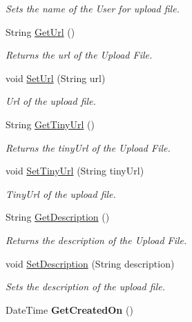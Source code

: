 \begin{DoxyCompactItemize}
\begin{DoxyCompactList}\small\item\em Sets the name of the User for upload file. \end{DoxyCompactList}\item 
String \hyperlink{classcom_1_1shephertz_1_1app42_1_1paas_1_1sdk_1_1csharp_1_1avatar_1_1_avatar_aa861c814d8fafecbd4e261db3becd226}{Get\+Url} ()
\begin{DoxyCompactList}\small\item\em Returns the url of the Upload File. \end{DoxyCompactList}\item 
void \hyperlink{classcom_1_1shephertz_1_1app42_1_1paas_1_1sdk_1_1csharp_1_1avatar_1_1_avatar_a58eeac9b19c38b9391f2dc3218778aad}{Set\+Url} (String url)
\begin{DoxyCompactList}\small\item\em Url of the upload file. \end{DoxyCompactList}\item 
String \hyperlink{classcom_1_1shephertz_1_1app42_1_1paas_1_1sdk_1_1csharp_1_1avatar_1_1_avatar_af5c2c3ea5d3fcfa675b50b3f9712089d}{Get\+Tiny\+Url} ()
\begin{DoxyCompactList}\small\item\em Returns the tiny\+Url of the Upload File. \end{DoxyCompactList}\item 
void \hyperlink{classcom_1_1shephertz_1_1app42_1_1paas_1_1sdk_1_1csharp_1_1avatar_1_1_avatar_a69c324056e8e5f155e10cf6b7d413b28}{Set\+Tiny\+Url} (String tiny\+Url)
\begin{DoxyCompactList}\small\item\em Tiny\+Url of the upload file. \end{DoxyCompactList}\item 
String \hyperlink{classcom_1_1shephertz_1_1app42_1_1paas_1_1sdk_1_1csharp_1_1avatar_1_1_avatar_a1bab1d2ba59d5a32b7f16cbd8e264856}{Get\+Description} ()
\begin{DoxyCompactList}\small\item\em Returns the description of the Upload File. \end{DoxyCompactList}\item 
void \hyperlink{classcom_1_1shephertz_1_1app42_1_1paas_1_1sdk_1_1csharp_1_1avatar_1_1_avatar_ad797a401ef5e0567ea083d1db2657f9a}{Set\+Description} (String description)
\begin{DoxyCompactList}\small\item\em Sets the description of the upload file. \end{DoxyCompactList}\item 
\hypertarget{classcom_1_1shephertz_1_1app42_1_1paas_1_1sdk_1_1csharp_1_1avatar_1_1_avatar_a4114f61b715ac522b0798cf1d6085a12}{Date\+Time {\bfseries Get\+Created\+On} ()}\label{classcom_1_1shephertz_1_1app42_1_1paas_1_1sdk_1_1csharp_1_1avatar_1_1_avatar_a4114f61b715ac522b0798cf1d6085a12}


\end{DoxyCompactItemize}
